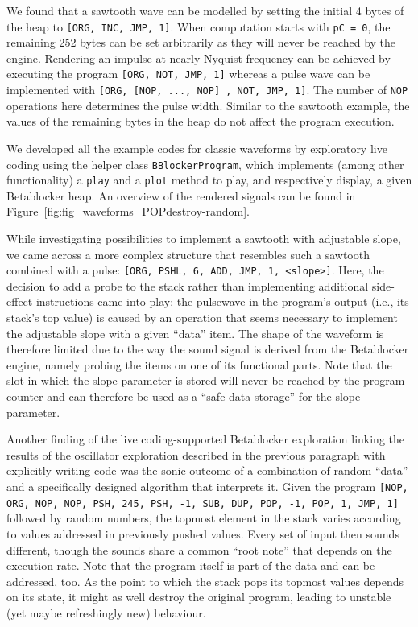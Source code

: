 \documentclass[letterpaper, 12pt]{article}
\begin{document}
We found that a sawtooth wave can be modelled by setting the initial 4 bytes of the heap to
\texttt{[ORG, INC, JMP, 1]}.
When computation starts with \texttt{pC = 0}, the remaining 252 bytes can be set arbitrarily as they will never be reached by the engine.
Rendering an impulse at nearly Nyquist frequency can be achieved by executing the program \texttt{[ORG, NOT, JMP, 1]} whereas a pulse wave can be implemented with \texttt{[ORG, [NOP, ..., NOP] , NOT, JMP, 1]}.
The number of \texttt{NOP} operations here determines the pulse width.
Similar to the sawtooth example, the values of the remaining bytes in the heap do not affect the program execution.

We developed all the example codes for classic waveforms by exploratory live coding using the helper class \texttt{BBlockerProgram}, which implements (among other functionality) a \texttt{play} and a \texttt{plot} method to play, and respectively display, a given Betablocker heap.
An overview of the rendered signals can be found in Figure~\ref{fig:fig_waveforms_POPdestroy-random}.


While investigating possibilities to implement a sawtooth with adjustable slope, we came across a more complex structure that resembles such a sawtooth combined with a pulse: \texttt{[ORG, PSHL, 6, ADD, JMP, 1, <slope>]}.
Here, the decision to add a probe to the stack rather than implementing additional side-effect instructions came into play: the pulsewave in the program's output (i.e., its stack's top value) is caused by an operation that seems necessary to implement the adjustable slope with a given ``data'' item.
The shape of the waveform is therefore limited due to the way the sound signal is derived from the Betablocker engine, namely probing the items on one of its functional parts.
Note that the slot in which the slope parameter is stored will never be reached by the program counter and can therefore be used as a ``safe data storage'' for the slope parameter.


Another finding of the live coding-supported Betablocker exploration linking the results of the oscillator exploration described in the previous paragraph with explicitly writing code was the sonic outcome of a combination of random ``data'' and a specifically designed algorithm that interprets it.
Given the program
\texttt{[NOP, ORG, NOP, NOP, PSH, 245, PSH, -1, SUB, DUP, POP, -1, POP, 1, JMP, 1]}
followed by random numbers, the topmost element in the stack varies according to values addressed in previously pushed values.
Every set of input then sounds different, though the sounds share a common ``root note'' that depends on the execution rate.
Note that the program itself is part of the data and can be addressed, too. As the point to which the stack pops its topmost values depends on its state, it might as well destroy the original program, leading to unstable (yet maybe refreshingly new) behaviour.
\end{document}

